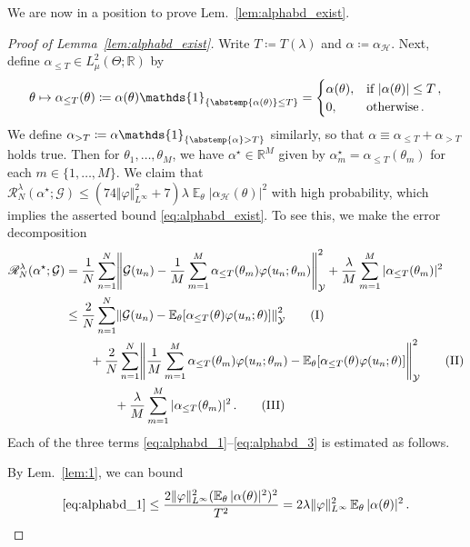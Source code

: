 \documentclass{article}
\theoremstyle{plain}
\theoremstyle{my_def}
\theoremstyle{my_rem}
\numberwithin{equation}{section}
\numberwithin{theorem}{section}%
\newcommand{\R}{\mathbb{R}}
\newcommand{\E}{\mathbb{E}}
\newcommand{\scrR}{\mathscr{R}}
\newcommand{\cG}{\mathcal{G}}
\newcommand{\cH}{\mathcal{H}}
\newcommand{\cY}{\mathcal{Y}}
\newcommand{\one}{\mathds{1}}%
\let\originalleft\left %
\let\originalright\right
\renewcommand{\left}{\mathopen{}\mathclose\bgroup\originalleft}
\renewcommand{\right}{\aftergroup\egroup\originalright}
\newcommand{\abs}{\abstemp}
\newcommand{\defeq}{\coloneqq} %
\renewcommand{\E}{\operatorname{\mathbb{E}}} %
\newcommand{\al}{\alpha}
\renewcommand{\phi}{\varphi}
\newcommand{\alst}{\al^{\star}}
\begin{document}
We are now in a position to prove Lem.~\ref{lem:alphabd_exist}.
\begin{proof}[Proof of Lemma~\ref{lem:alphabd_exist}]
Write $T\defeq T(\lambda)$ and $\al\defeq\al_\cH$. Next, define $\al_{\le T}\in L^2_\mu(\Theta;\R)$ by
\begin{equation*}
    \theta\mapsto \alpha_{\le T}(\theta)\defeq \al(\theta)\one_{\{\abs{\al(\theta)}\leq T\}}  = 
    \begin{cases}
    \alpha(\theta), & \text{if }|\alpha(\theta)| \le T\,, \\
    0, & \text{otherwise}\,.
    \end{cases}
\end{equation*}
We define $\alpha_{>T}\defeq \al\one_{\{\abs{\al}>T\}}$ similarly, so that $\alpha \equiv \alpha_{\le T} + \al_{>T}$ holds true. Then for $\theta_1,\dots, \theta_M$, we have $\alst \in \R^M$ given by $\alst_m=\al_{\le T}(\theta_m)$ for each $m\in\{1,\ldots, M\}$. 
We claim that $\scrR_N^\lambda(\alst;\cG) \le (74 \Vert \phi \Vert_{L^\infty}^2 + 7)\lambda \E_\theta|\alpha_\cH(\theta)|^2$ with high probability, which implies the asserted bound \eqref{eq:alphabd_exist}. To see this, we make the error decomposition
\begin{align}
\scrR_N^\lambda(\alst;\cG) 
&=
\frac{1}{N} \sum_{n=1}^N \left\Vert
 \cG(u_n) - \frac{1}{M} \sum_{m=1}^M \al_{\le T}(\theta_m) \phi(u_n;\theta_m)
 \right\Vert^2_{\cY}
 +
 \frac{\lambda}{M} \sum_{m=1}^M |\al_{\le T}(\theta_m)|^2
 \\
&\le
\frac{2}{N} \sum_{n=1}^N \left\Vert
 \cG(u_n) - \E_\theta\left[ \alpha_{\le T}(\theta) \phi(u_n;\theta) \right]
 \right\Vert^2_{\cY}\tag{I}\label{eq:alphabd_1}
 \\
 &\qquad
 + \frac{2}{N} \sum_{n=1}^N \left\Vert
 \frac{1}{M} \sum_{m=1}^M \alpha_{\le T}(\theta_m) \phi(u_n;\theta_m) - \E_\theta\left[ \alpha_{\le T}(\theta) \phi(u_n;\theta) \right]
 \right\Vert^2_{\cY}\tag{II}\label{eq:alphabd_2}
 \\
 &\qquad\qquad
 + \frac{\lambda}{M} \sum_{m=1}^M |\alpha_{\le T}(\theta_m)|^2\,.
 \tag{III}\label{eq:alphabd_3}
\end{align}
Each of the three terms \eqref{eq:alphabd_1}--\eqref{eq:alphabd_3} is estimated as follows.

By Lem.~\ref{lem:1}, we can bound
\begin{equation*}
    \eqref{eq:alphabd_1}
\le \frac{2\Vert \phi \Vert_{L^\infty}^2 (\E_\theta|\al(\theta)|^2)^2}{T^2}
= 2 \lambda \Vert \phi \Vert_{L^\infty}^2 \E_\theta|\al(\theta)|^2\,.
\end{equation*}


\end{proof}
\end{document}
